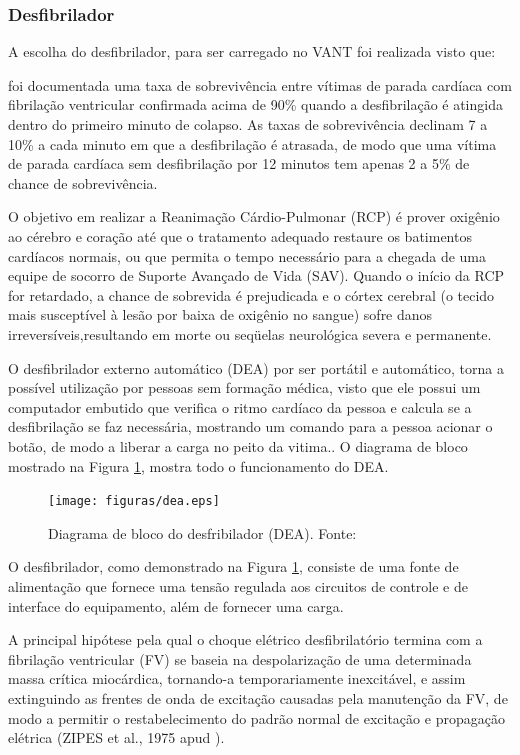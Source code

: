 \subsubsection{Desfibrilador}

A escolha do desfibrilador, para ser carregado no VANT foi realizada visto que:

\begin{citacao}
foi documentada uma taxa de 
sobrevivência entre vítimas de parada cardíaca com fibrilação ventricular confirmada acima de 90\% quando a desfibrilação é atingida
dentro do primeiro minuto de colapso. As taxas de sobrevivência declinam 7 a 10\% a cada minuto em que a desfibrilação
é atrasada, de modo que uma vítima de parada cardíaca sem desfibrilação por 12 minutos tem apenas 2 a 5\%
de chance de sobrevivência.\cite{1}
\end{citacao}

O objetivo em realizar a Reanimação Cárdio-Pulmonar (RCP) é prover oxigênio ao cérebro e coração até que
o tratamento adequado restaure os batimentos cardíacos normais, ou que permita o tempo necessário para a 
chegada de uma equipe de socorro de Suporte Avançado de Vida (SAV). Quando o início da RCP for retardado, 
a chance de sobrevida é prejudicada e o córtex cerebral (o tecido mais susceptível à lesão por baixa de 
oxigênio no sangue) sofre danos irreversíveis,resultando em morte ou seqüelas neurológica severa e permanente. \cite{2}

O desfibrilador externo automático (DEA) por ser portátil e automático, torna a possível utilização por 
pessoas sem formação médica, visto que ele possui um computador embutido que verifica o ritmo cardíaco da 
pessoa e calcula se a desfibrilação se faz necessária, mostrando um comando para a pessoa acionar o botão, de 
modo a liberar a carga no peito da vitima.\cite{3}. O diagrama de bloco mostrado na Figura \ref{fig:dea}, mostra todo o funcionamento do DEA.

\begin{figure}[H]
	\centering
	  \texttt{[image: figuras/dea.eps]}
	\caption{Diagrama de bloco do desfribilador (DEA). Fonte: \cite{bloco}}
	\label{fig:dea}
\end{figure}

O desfibrilador, como demonstrado na Figura \ref{fig:dea}, consiste de uma fonte  de alimentação que 
fornece uma tensão regulada aos circuitos de controle e de interface do equipamento, além de fornecer uma carga.

A principal hipótese pela qual o choque elétrico desfibrilatório termina com a fibrilação ventricular (FV) se
baseia na despolarização de uma determinada massa crítica miocárdica, tornando-a temporariamente inexcitável, e
assim extinguindo as frentes de onda de excitação causadas pela manutenção da FV, de modo a permitir o 
restabelecimento do padrão normal de excitação e propagação elétrica (ZIPES et al., 1975 apud ).

